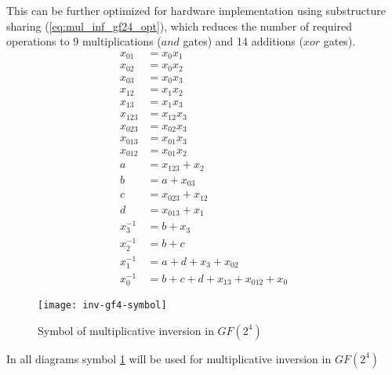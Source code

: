 This can be further optimized for hardware implementation using substructure sharing (\ref{eq:mul_inf_gf24_opt}), which reduces the number of required operations to 9 multiplications ($and$ gates) and 14 additions ($xor$ gates).
\begin{equation}
\label{eq:mul_inf_gf24_opt}
\begin{aligned}
x_{01}   &= x_0x_1                             \\
x_{02}   &= x_0x_2                             \\
x_{03}   &= x_0x_3                             \\
x_{12}   &= x_1x_2                             \\
x_{13}   &= x_1x_3                             \\
x_{123}  &= x_{12}x_3                          \\
x_{023}  &= x_{02}x_3                          \\
x_{013}  &= x_{01}x_3                          \\
x_{012}  &= x_{01}x_2                          \\
a        &= x_{123} + x_2                      \\
b        &= a + x_{03}                         \\
c        &= x_{023} + x_{12}                   \\
d        &= x_{013} + x_{1}                    \\
x_3^{-1} &= b + x_3                            \\
x_2^{-1} &= b + c                              \\
x_1^{-1} &= a + d + x_3 + x_{02}               \\
x_0^{-1} &= b + c + d + x_{13} + x_{012} + x_0
\end{aligned}
\end{equation}


\begin{figure}
\label{fig:mul_inv_gf4_symbol}
\centering
\texttt{[image: inv-gf4-symbol]}
\caption{Symbol of multiplicative inversion in $GF(2^4)$}
\end{figure}

In all diagrams symbol \ref{fig:mul_inv_gf4_symbol} will be used for multiplicative inversion in $GF(2^4)$



